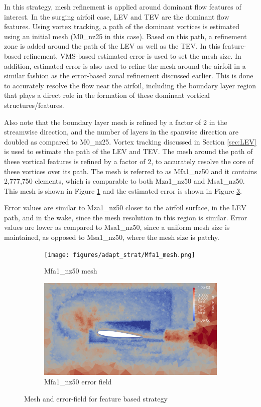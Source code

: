 In this strategy, mesh refinement is applied around dominant flow features of interest. 
In the surging airfoil case, LEV and TEV are the dominant flow features. 
Using vortex tracking, a path of the dominant vortices is estimated using an initial mesh (M0\_nz25 in this case). 
Based on this path, a refinement zone is added around the path of the LEV as well as the TEV. 
In this feature-based refinement, VMS-based estimated error is used to set the mesh size. 
In addition, estimated error is also used to refine the mesh around the airfoil in a similar fashion as the error-based zonal refinement discussed earlier. 
This is done to accurately resolve the flow near the airfoil, including the boundary layer region that plays a direct role in the formation of these dominant vortical structures/features.

Also note that the boundary layer mesh is refined by a factor of 2 in the streamwise direction, and the number of layers in the spanwise direction are doubled as compared to M0\_nz25.  
Vortex tracking discussed in Section \ref{sec:LEV} is used to estimate the path of the LEV and TEV. 
The mesh around the path of these vortical features is refined by a factor of 2, to accurately resolve the core of these vortices over its path. 
The mesh is referred to as Mfa1\_nz50 and it contains 2,777,750 elements, which is comparable to both Mza1\_nz50 and Msa1\_nz50.
This mesh is shown in Figure \ref{fig:FB_mesh} and the estimated error is shown in Figure \ref{fig:FB_error_plot}.

Error values are similar to Mza1\_nz50 closer to the airfoil surface, in the LEV path, and in the wake, since the mesh resolution in this region is similar.
Error values are lower as compared to Msa1\_nz50, since a uniform mesh size is maintained, as opposed to Msa1\_nz50, where the mesh size is patchy.


\begin{figure}[H]
\centering

\begin{subfigure}[b]{0.475\textwidth}
\centering
\texttt{[image: figures/adapt\_strat/Mfa1\_mesh.png]}
\caption{Mfa1\_nz50 mesh}
\label{fig:FB_mesh}
\end{subfigure}
\begin{subfigure}[b]{0.475\textwidth}
\centering
\includegraphics[width=1\textwidth]{figures/adapt_strat/Mfa1_error.png}
\caption{Mfa1\_nz50 error field}
\label{fig:FB_error_plot}
\end{subfigure}

\caption{Mesh and error-field for feature based strategy}
\end{figure}